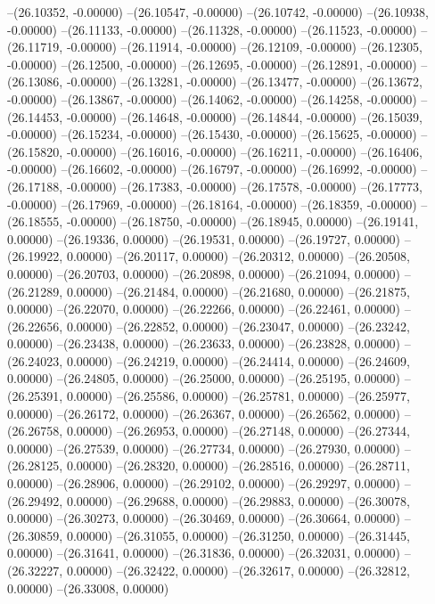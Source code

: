 --(26.10352, -0.00000)
--(26.10547, -0.00000)
--(26.10742, -0.00000)
--(26.10938, -0.00000)
--(26.11133, -0.00000)
--(26.11328, -0.00000)
--(26.11523, -0.00000)
--(26.11719, -0.00000)
--(26.11914, -0.00000)
--(26.12109, -0.00000)
--(26.12305, -0.00000)
--(26.12500, -0.00000)
--(26.12695, -0.00000)
--(26.12891, -0.00000)
--(26.13086, -0.00000)
--(26.13281, -0.00000)
--(26.13477, -0.00000)
--(26.13672, -0.00000)
--(26.13867, -0.00000)
--(26.14062, -0.00000)
--(26.14258, -0.00000)
--(26.14453, -0.00000)
--(26.14648, -0.00000)
--(26.14844, -0.00000)
--(26.15039, -0.00000)
--(26.15234, -0.00000)
--(26.15430, -0.00000)
--(26.15625, -0.00000)
--(26.15820, -0.00000)
--(26.16016, -0.00000)
--(26.16211, -0.00000)
--(26.16406, -0.00000)
--(26.16602, -0.00000)
--(26.16797, -0.00000)
--(26.16992, -0.00000)
--(26.17188, -0.00000)
--(26.17383, -0.00000)
--(26.17578, -0.00000)
--(26.17773, -0.00000)
--(26.17969, -0.00000)
--(26.18164, -0.00000)
--(26.18359, -0.00000)
--(26.18555, -0.00000)
--(26.18750, -0.00000)
--(26.18945, 0.00000)
--(26.19141, 0.00000)
--(26.19336, 0.00000)
--(26.19531, 0.00000)
--(26.19727, 0.00000)
--(26.19922, 0.00000)
--(26.20117, 0.00000)
--(26.20312, 0.00000)
--(26.20508, 0.00000)
--(26.20703, 0.00000)
--(26.20898, 0.00000)
--(26.21094, 0.00000)
--(26.21289, 0.00000)
--(26.21484, 0.00000)
--(26.21680, 0.00000)
--(26.21875, 0.00000)
--(26.22070, 0.00000)
--(26.22266, 0.00000)
--(26.22461, 0.00000)
--(26.22656, 0.00000)
--(26.22852, 0.00000)
--(26.23047, 0.00000)
--(26.23242, 0.00000)
--(26.23438, 0.00000)
--(26.23633, 0.00000)
--(26.23828, 0.00000)
--(26.24023, 0.00000)
--(26.24219, 0.00000)
--(26.24414, 0.00000)
--(26.24609, 0.00000)
--(26.24805, 0.00000)
--(26.25000, 0.00000)
--(26.25195, 0.00000)
--(26.25391, 0.00000)
--(26.25586, 0.00000)
--(26.25781, 0.00000)
--(26.25977, 0.00000)
--(26.26172, 0.00000)
--(26.26367, 0.00000)
--(26.26562, 0.00000)
--(26.26758, 0.00000)
--(26.26953, 0.00000)
--(26.27148, 0.00000)
--(26.27344, 0.00000)
--(26.27539, 0.00000)
--(26.27734, 0.00000)
--(26.27930, 0.00000)
--(26.28125, 0.00000)
--(26.28320, 0.00000)
--(26.28516, 0.00000)
--(26.28711, 0.00000)
--(26.28906, 0.00000)
--(26.29102, 0.00000)
--(26.29297, 0.00000)
--(26.29492, 0.00000)
--(26.29688, 0.00000)
--(26.29883, 0.00000)
--(26.30078, 0.00000)
--(26.30273, 0.00000)
--(26.30469, 0.00000)
--(26.30664, 0.00000)
--(26.30859, 0.00000)
--(26.31055, 0.00000)
--(26.31250, 0.00000)
--(26.31445, 0.00000)
--(26.31641, 0.00000)
--(26.31836, 0.00000)
--(26.32031, 0.00000)
--(26.32227, 0.00000)
--(26.32422, 0.00000)
--(26.32617, 0.00000)
--(26.32812, 0.00000)
--(26.33008, 0.00000)
